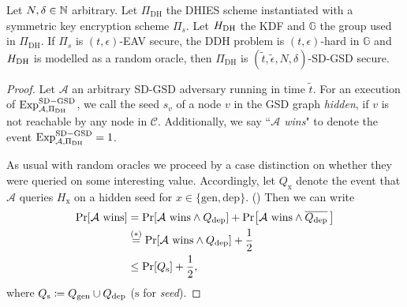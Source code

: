 \begin{theorem} \label{theorem:sdgsd-security}
	Let $N, \delta \in \mathbb{N}$ arbitrary. Let $\Pi_{\mathrm{DH}}$ the DHIES scheme instantiated with a symmetric key encryption scheme $\Pi_s$. Let $H_\mathrm{DH}$ the KDF and $\mathbb{G}$ the group used in $\Pi_{\mathrm{DH}}$. If $\Pi_s$ is $(t, \epsilon)$-EAV secure, the DDH problem is $(t, \epsilon)$-hard in $\mathbb{G}$ and $H_\mathrm{DH}$ is modelled as a random oracle, then $\Pi_{\mathrm{DH}}$ is $(\tilde{t}, \tilde{\epsilon}, N, \delta)$-SD-GSD secure.
\end{theorem}
\begin{proof}
	Let $\mathcal{A}$ an arbitrary SD-GSD adversary running in time $\tilde{t}$. For an execution of $\mathrm{Exp}_{\mathcal{A}, \Pi_{\mathrm{DH}}}^{\mathrm{SD-GSD}}$, we call the seed $s_v$ of a node $v$ in the GSD graph \emph{hidden}, if $v$ is not reachable by any node in $\mathcal{C}$. Additionally, we say ``\emph{$\mathcal{A}$ wins}" to denote the event $\mathrm{Exp}_{\mathcal{A}, \Pi_{\mathrm{DH}}}^{\mathrm{SD-GSD}} = 1$.

	As usual with random oracles we proceed by a case distinction on whether they were queried on some interesting value. Accordingly, let $Q_{\mathrm{x}}$ denote the event that $\mathcal{A}$ queries $H_{\mathrm{x}}$ on a hidden seed for $x \in \{\mathrm{gen}, \mathrm{dep}\}$. () Then we can write
	\begin{align*}
		\pr{\wins} & = \pr{\wins \land \qdep} + \pr{\wins \land \overline{\qdep} \,} \\
		           & \stackrel{(*)}{=}  \pr{\wins \land \qdep} + \frac{1}{2}         \\
		           & \le \pr{\qs} + \frac{1}{2},
	\end{align*}
	where $Q_\mathrm{s} \coloneqq Q_\mathrm{gen} \cup Q_\mathrm{dep}$ ($\mathrm{s}$ for \emph{seed}).



\end{proof}
